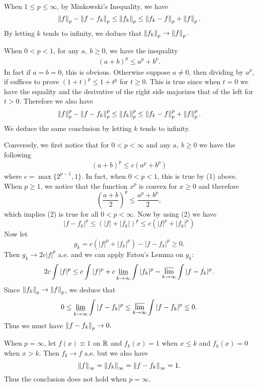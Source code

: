\begin{exercise}{8.12}
  When $1\leq p\leq\infty$, by Minkowski's Inequality, we have
  \[
    \left\|f\right\|_p-\left\|f-f_k\right\|_p\leq\left\|f_k\right\|_p\leq\left\|f_k-f\right\|_p+\left\|f\right\|_p.
  \]
  By letting $k$ tends to infinity, we deduce that $\left\|f_k\right\|_p\rightarrow\left\|f\right\|_p.$
  
  When $0<p<1$, for any $a,\ b\geq 0$, we have the inequality
  \begin{align}
    (a+b)^p\leq a^p+b^p.
  \end{align}
  In fact if $a=b=0$, this is obvious. Otherwise suppose $a\neq 0$, then dividing by $a^p$, if suffices to prove $(1+t)^p\leq 1+t^p$ for $t\geq 0$. This is true since when $t=0$ we have the equality and the derivative of the right side majorizes that of the left for $t>0$. Therefore we also have
  \[
    \left\|f\right\|_p^p-\left\|f-f_k\right\|_p^p\leq\left\|f_k\right\|_p^p\leq\left\|f_k-f\right\|_p^p+\left\|f\right\|_p^p.
  \]
  We deduce the same conclusion by letting $k$ tends to infinity.
  
  Conversely, we first notice that for $0<p<\infty$ and any $a,\ b\geq 0$ we have the following
  \begin{align}
    (a+b)^p\leq c(a^p+b^p)
  \end{align}
  where $c=\max\{2^{p-1},1\}$. In fact, when $0<p<1$, this is true by (1) above. When $p\geq 1$, we notice that the function $x^p$ is convex for $x\geq 0$ and therefore 
  \[
    (\frac{a+b}{2})^p\leq \frac{a^p+b^p}{2},
  \]
  which implies (2) is true for all $0<p<\infty.$ Now by using (2) we have
  \[
    |f-f_k|^p\leq (|f|+|f_k|)^p\leq c(|f|^p+|f_k|^p)
  \]
  Now let 
  \[
    g_k=c(|f|^p+|f_k|^p)-|f-f_k|^p\geq 0.
  \]
  Then $g_k\rightarrow 2c|f|^p$ a.e. and we can apply Fatou's Lemma on $g_k$:
  \[
    2c\int|f|^p\leq c\int|f|^p+c\varliminf_{k\rightarrow\infty}\int|f_k|^p-\varlimsup_{k\rightarrow\infty}\int|f-f_k|^p.
  \]
  Since $\left\|f_k\right\|_p\rightarrow\left\|f\right\|_p$, we deduce that
  \[
    0\leq\varliminf_{k\rightarrow\infty}\int|f-f_k|^p\leq\varlimsup_{k\rightarrow\infty}\int|f-f_k|^p\leq 0.
  \]
  Thus we must have $\left\|f-f_k\right\|_p\rightarrow 0.$
  
  When $p=\infty$, let $f(x)\equiv1$ on $\mathbb{R}$ and $f_k(x)=1$ when $x\leq k$ and $f_k(x)=0$ when $x>k.$ Then $f_k\rightarrow f$ a.e. but we also have 
  \[
    \left\|f\right\|_{\infty}=\left\|f_k\right\|_{\infty}=\left\|f-f_k\right\|_{\infty}=1.
  \]
  Thus the conclusion does not hold when $p=\infty.$
\end{exercise}

